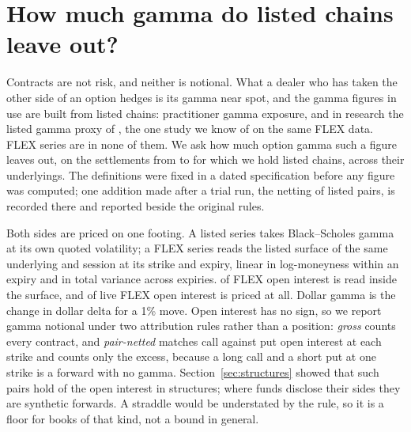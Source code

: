 \documentclass[11pt]{article}
\begin{document}
\section{How much gamma do listed chains leave out?}
\label{sec:gamma}

Contracts are not risk, and neither is notional. What a dealer who has taken the other
side of an option hedges is its gamma near spot, and the gamma figures in use are built
from listed chains: practitioner gamma exposure, and in research the listed gamma
proxy of \citet{prakash2026}, the one study we know of on the same FLEX data. FLEX
series are in none of them. We ask how much option gamma such a figure leaves out, on
the \GammaSettlements{} settlements from \GammaStart{} to \GammaEnd{} for which we hold
listed chains, across their \GammaUnderlyings{} underlyings. The definitions were fixed
in a dated specification before any figure was computed; one addition made after a trial
run, the netting of listed pairs, is recorded there and reported beside the original
rules.

Both sides are priced on one footing. A listed series takes Black--Scholes gamma at its
own quoted volatility; a FLEX series reads the listed surface of the same underlying and
session at its strike and expiry, linear in log-moneyness within an expiry and in total
variance across expiries. \GammaInteriorShare{} of FLEX open interest is read inside the
surface, and \GammaPricedShare{} of live FLEX open interest is priced at all. Dollar
gamma is the change in dollar delta for a 1\% move. Open interest has no sign, so we
report gamma notional under two attribution rules rather than a position: \emph{gross}
counts every contract, and \emph{pair-netted} matches call against put open interest at
each strike and counts only the excess, because a long call and a short put at one strike
is a forward with no gamma. Section~\ref{sec:structures} showed that such pairs hold
\PosShareSynthetic{} of the open interest in structures; where funds disclose their sides they are synthetic forwards. A
straddle would be understated by the rule, so it is a floor for books of that kind, not a
bound in general.


\end{document}
